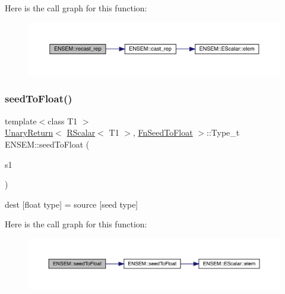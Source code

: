 Here is the call graph for this function\+:\nopagebreak
\begin{figure}[H]
\begin{center}
\leavevmode
\includegraphics[width=350pt]{d9/ded/group__rscalar_ga1ecb21d4e8fc1e664055d3fa1145f6e9_cgraph}
\end{center}
\end{figure}
\mbox{\label{group__rscalar_gaaeb1321ab6946f99106e2a50f9098353}} 
\subsubsection{\texorpdfstring{seedToFloat()}{seedToFloat()}}
{\footnotesize\ttfamily template$<$class T1 $>$ \\
\mbox{\hyperlink{structENSEM_1_1UnaryReturn}{Unary\+Return}}$<$ \mbox{\hyperlink{classENSEM_1_1RScalar}{R\+Scalar}}$<$ T1 $>$, \mbox{\hyperlink{structENSEM_1_1FnSeedToFloat}{Fn\+Seed\+To\+Float}} $>$\+::Type\+\_\+t E\+N\+S\+E\+M\+::seed\+To\+Float (\begin{DoxyParamCaption}\item[{const \mbox{\hyperlink{classENSEM_1_1RScalar}{R\+Scalar}}$<$ T1 $>$ \&}]{s1 }\end{DoxyParamCaption})\hspace{0.3cm}{\ttfamily [inline]}}



dest \mbox{[}float type\mbox{]} = source \mbox{[}seed type\mbox{]} 

Here is the call graph for this function\+:\nopagebreak
\begin{figure}[H]
\begin{center}
\leavevmode
\includegraphics[width=350pt]{d9/ded/group__rscalar_gaaeb1321ab6946f99106e2a50f9098353_cgraph}
\end{center}
\end{figure}
\mbox{\label{group__rscalar_ga60f574c6e8f0da11360b8c41c46490a5}} 
